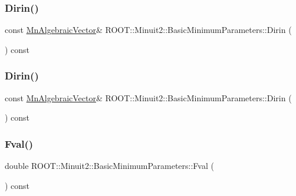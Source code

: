 \subsubsection{\texorpdfstring{Dirin()}{Dirin()}\hspace{0.1cm}{\footnotesize\ttfamily [1/2]}}
{\footnotesize\ttfamily const \mbox{\hyperlink{namespaceROOT_1_1Minuit2_a62ed97730a1ca8d3fbaec64a19aa11c9}{Mn\+Algebraic\+Vector}}\& R\+O\+O\+T\+::\+Minuit2\+::\+Basic\+Minimum\+Parameters\+::\+Dirin (\begin{DoxyParamCaption}{ }\end{DoxyParamCaption}) const\hspace{0.3cm}{\ttfamily [inline]}}

\mbox{\label{classROOT_1_1Minuit2_1_1BasicMinimumParameters_a4a4abef44e633bce699eb280228702e1}} 
\subsubsection{\texorpdfstring{Dirin()}{Dirin()}\hspace{0.1cm}{\footnotesize\ttfamily [2/2]}}
{\footnotesize\ttfamily const \mbox{\hyperlink{namespaceROOT_1_1Minuit2_a62ed97730a1ca8d3fbaec64a19aa11c9}{Mn\+Algebraic\+Vector}}\& R\+O\+O\+T\+::\+Minuit2\+::\+Basic\+Minimum\+Parameters\+::\+Dirin (\begin{DoxyParamCaption}{ }\end{DoxyParamCaption}) const\hspace{0.3cm}{\ttfamily [inline]}}

\mbox{\label{classROOT_1_1Minuit2_1_1BasicMinimumParameters_a5d92e23ec6117dd29e3e7e2b62ebaf16}} 
\subsubsection{\texorpdfstring{Fval()}{Fval()}\hspace{0.1cm}{\footnotesize\ttfamily [1/2]}}
{\footnotesize\ttfamily double R\+O\+O\+T\+::\+Minuit2\+::\+Basic\+Minimum\+Parameters\+::\+Fval (\begin{DoxyParamCaption}{ }\end{DoxyParamCaption}) const\hspace{0.3cm}{\ttfamily [inline]}}

